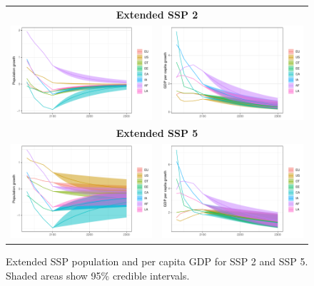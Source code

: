 \documentclass[12pt,english]{article}
\begin{document}
\begin{figure}[h!]
    \centering
    \begin{tabular}{cc}
        \multicolumn{2}{c}{\bf Extended SSP 2} \\
        \includegraphics[width=.5\textwidth]{figures/ssp2-pop.pdf} & \includegraphics[width=.5\textwidth]{figures/ssp2-gdppc.pdf} \\
        \multicolumn{2}{c}{\bf Extended SSP 5} \\
        \includegraphics[width=.5\textwidth]{figures/ssp5-pop.pdf} & \includegraphics[width=.5\textwidth]{figures/ssp5-gdppc.pdf} \\
    \end{tabular}
    \caption{Extended SSP population and per capita GDP for SSP 2 and SSP 5. Shaded areas show 95\% credible intervals. \label{fig:sspextend}}
\end{figure}



\end{document}
